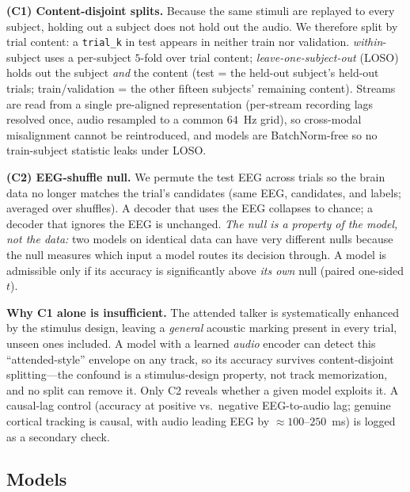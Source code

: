 \documentclass[journal]{IEEEtran}
\begin{document}
\textbf{(C1) Content-disjoint splits.} Because the same stimuli are replayed to
every subject, holding out a subject does not hold out the audio. We therefore split
by trial content: a \texttt{trial\_k} in test appears in neither train nor
validation. \emph{within}-subject uses a per-subject $5$-fold over trial content;
\emph{leave-one-subject-out} (LOSO) holds out the subject \emph{and} the content
(test = the held-out subject's held-out trials; train/validation = the other fifteen
subjects' remaining content). Streams are read from a single pre-aligned
representation (per-stream recording lags resolved once, audio resampled to a common
$64$~Hz grid), so cross-modal misalignment cannot be reintroduced, and models are
BatchNorm-free so no train-subject statistic leaks under LOSO.

\textbf{(C2) EEG-shuffle null.} We permute the test EEG across trials so the brain
data no longer matches the trial's candidates (same EEG, candidates, and labels;
averaged over shuffles). A decoder that uses the EEG collapses to chance; a decoder
that ignores the EEG is unchanged. \emph{The null is a property of the model, not the
data:} two models on identical data can have very different nulls because the null
measures which input a model routes its decision through. A model is admissible only
if its accuracy is significantly above \emph{its own} null (paired one-sided $t$).

\textbf{Why C1 alone is insufficient.} The attended talker is systematically enhanced
by the stimulus design, leaving a \emph{general} acoustic marking present in every
trial, unseen ones included. A model with a learned \emph{audio} encoder can detect
this ``attended-style'' envelope on any track, so its accuracy survives
content-disjoint splitting---the confound is a stimulus-design property, not track
memorization, and no split can remove it. Only C2 reveals whether a given model
exploits it. A causal-lag control (accuracy at positive vs.\ negative EEG-to-audio
lag; genuine cortical tracking is causal, with audio leading EEG by
$\approx\!100$--$250$~ms) is logged as a secondary check.

\subsection{Models}
\label{sec:bench-models}
\end{document}

